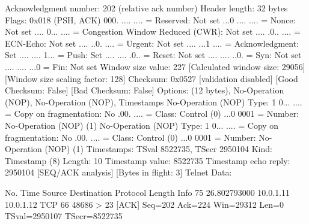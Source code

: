     Acknowledgment number: 202    (relative ack number)
    Header length: 32 bytes
    Flags: 0x018 (PSH, ACK)
        000. .... .... = Reserved: Not set
        ...0 .... .... = Nonce: Not set
        .... 0... .... = Congestion Window Reduced (CWR): Not set
        .... .0.. .... = ECN-Echo: Not set
        .... ..0. .... = Urgent: Not set
        .... ...1 .... = Acknowledgment: Set
        .... .... 1... = Push: Set
        .... .... .0.. = Reset: Not set
        .... .... ..0. = Syn: Not set
        .... .... ...0 = Fin: Not set
    Window size value: 227
    [Calculated window size: 29056]
    [Window size scaling factor: 128]
    Checksum: 0x0527 [validation disabled]
        [Good Checksum: False]
        [Bad Checksum: False]
    Options: (12 bytes), No-Operation (NOP), No-Operation (NOP), Timestamps
        No-Operation (NOP)
            Type: 1
                0... .... = Copy on fragmentation: No
                .00. .... = Class: Control (0)
                ...0 0001 = Number: No-Operation (NOP) (1)
        No-Operation (NOP)
            Type: 1
                0... .... = Copy on fragmentation: No
                .00. .... = Class: Control (0)
                ...0 0001 = Number: No-Operation (NOP) (1)
        Timestamps: TSval 8522735, TSecr 2950104
            Kind: Timestamp (8)
            Length: 10
            Timestamp value: 8522735
            Timestamp echo reply: 2950104
    [SEQ/ACK analysis]
        [Bytes in flight: 3]
Telnet
    Data: 

No.     Time           Source                Destination           Protocol Length Info
     75 26.802793000   10.0.1.11             10.0.1.12             TCP      66     48686 > 23 [ACK] Seq=202 Ack=224 Win=29312 Len=0 TSval=2950107 TSecr=8522735

